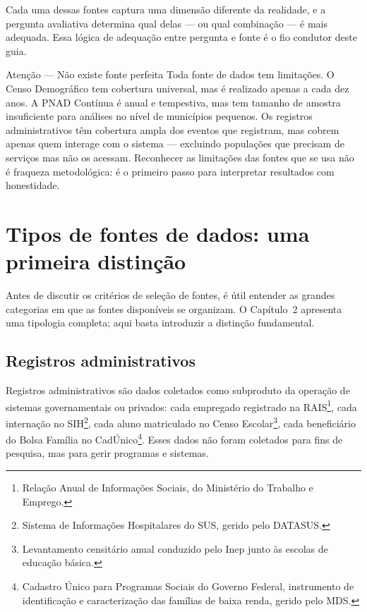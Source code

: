 Cada uma dessas fontes captura uma dimensão diferente da realidade, e a pergunta avaliativa determina qual delas --- ou qual combinação --- é mais adequada. Essa lógica de adequação entre pergunta e fonte é o fio condutor deste guia.

\begin{boxatencao}{Atenção --- Não existe fonte perfeita}
Toda fonte de dados tem limitações. O Censo Demográfico tem cobertura universal, mas é realizado apenas a cada dez anos. A PNAD Contínua é anual e tempestiva, mas tem tamanho de amostra insuficiente para análises no nível de municípios pequenos. Os registros administrativos têm cobertura ampla dos eventos que registram, mas cobrem apenas quem interage com o sistema --- excluindo populações que precisam de serviços mas não os acessam. Reconhecer as limitações das fontes que se usa não é fraqueza metodológica: é o primeiro passo para interpretar resultados com honestidade.
\end{boxatencao}

\section{Tipos de fontes de dados: uma primeira distinção}

Antes de discutir os critérios de seleção de fontes, é útil entender as grandes categorias em que as fontes disponíveis se organizam. O Capítulo~2 apresenta uma tipologia completa; aqui basta introduzir a distinção fundamental.

\subsection{Registros administrativos}

Registros administrativos são dados coletados como subproduto da operação de sistemas governamentais ou privados: cada empregado registrado na RAIS\footnote{Relação Anual de Informações Sociais, do Ministério do Trabalho e Emprego.}, cada internação no SIH\footnote{Sistema de Informações Hospitalares do SUS, gerido pelo DATASUS.}, cada aluno matriculado no Censo Escolar\footnote{Levantamento censitário anual conduzido pelo Inep junto às escolas de educação básica.}, cada beneficiário do Bolsa Família no CadÚnico\footnote{Cadastro Único para Programas Sociais do Governo Federal, instrumento de identificação e caracterização das famílias de baixa renda, gerido pelo MDS.}. Esses dados não foram coletados para fins de pesquisa, mas para gerir programas e sistemas.

